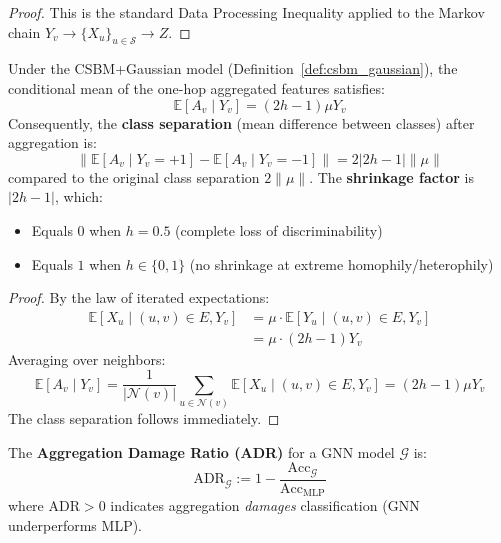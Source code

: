 \begin{proof}
This is the standard Data Processing Inequality applied to the Markov chain $Y_v \to \{X_u\}_{u \in \mathcal{S}} \to Z$.
\end{proof}

\begin{theorem}
\label{thm:discriminability_shrinkage}
Under the CSBM+Gaussian model (Definition~\ref{def:csbm_gaussian}), the conditional mean of the one-hop aggregated features satisfies:
\begin{equation}
    \mathbb{E}[A_v \mid Y_v] = (2h - 1) \mu Y_v
\end{equation}
Consequently, the \textbf{class separation} (mean difference between classes) after aggregation is:
\begin{equation}
    \|\mathbb{E}[A_v \mid Y_v = +1] - \mathbb{E}[A_v \mid Y_v = -1]\| = 2|2h - 1| \|\mu\|
\end{equation}
compared to the original class separation $2\|\mu\|$. The \textbf{shrinkage factor} is $|2h - 1|$, which:
\begin{itemize}
    \item Equals $0$ when $h = 0.5$ (complete loss of discriminability)
    \item Equals $1$ when $h \in \{0, 1\}$ (no shrinkage at extreme homophily/heterophily)
\end{itemize}
\end{theorem}

\begin{proof}
By the law of iterated expectations:
\begin{align}
    \mathbb{E}[X_u \mid (u, v) \in E, Y_v] &= \mu \cdot \mathbb{E}[Y_u \mid (u, v) \in E, Y_v] \\
    &= \mu \cdot (2h - 1) Y_v
\end{align}
Averaging over neighbors:
\begin{equation}
    \mathbb{E}[A_v \mid Y_v] = \frac{1}{|\mathcal{N}(v)|} \sum_{u \in \mathcal{N}(v)} \mathbb{E}[X_u \mid (u, v) \in E, Y_v] = (2h - 1) \mu Y_v
\end{equation}
The class separation follows immediately.
\end{proof}

\begin{definition}
\label{def:adr_formal}
The \textbf{Aggregation Damage Ratio (ADR)} for a GNN model $\mathcal{G}$ is:
\begin{equation}
    \text{ADR}_{\mathcal{G}} := 1 - \frac{\mathrm{Acc}_{\mathcal{G}}}{\mathrm{Acc}_{\text{MLP}}}
\end{equation}
where $\text{ADR} > 0$ indicates aggregation \textit{damages} classification (GNN underperforms MLP).
\end{definition}

